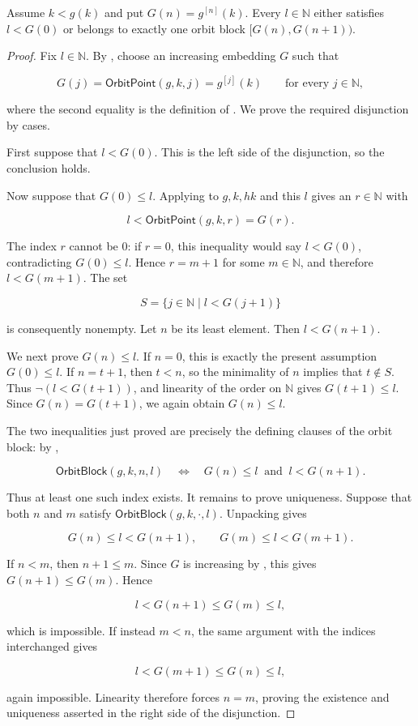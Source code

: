 \begin{lemma}
Assume $k<g(k)$ and put $G(n)=g^{[n]}(k)$.  Every $l\in\mathbb N$ either
satisfies $l<G(0)$ or belongs to exactly one orbit block
$[G(n),G(n+1))$.
\end{lemma}
\begin{proof}
Fix $l\in\mathbb N$.  By , choose an increasing
embedding $G$ such that

\[
G(j)=\mathsf{OrbitPoint}(g,k,j)=g^{[j]}(k)
\qquad\text{for every }j\in\mathbb N,
\]

where the second equality is the definition of .
We prove the required disjunction by cases.

First suppose that $l<G(0)$.  This is the left side of the disjunction,
so the conclusion holds.

Now suppose that $G(0)\leq l$.  Applying  to
$g,k,hk$ and this $l$ gives an $r\in\mathbb N$ with

\[
l<\mathsf{OrbitPoint}(g,k,r)=G(r).
\]

The index $r$ cannot be $0$: if $r=0$, this inequality would say
$l<G(0)$, contradicting $G(0)\leq l$.  Hence $r=m+1$ for some
$m\in\mathbb N$, and therefore $l<G(m+1)$.  The set

\[
S=\{j\in\mathbb N\mid l<G(j+1)\}
\]

is consequently nonempty.  Let $n$ be its least element.  Then
$l<G(n+1)$.

We next prove $G(n)\leq l$.  If $n=0$, this is exactly the present
assumption $G(0)\leq l$.  If $n=t+1$, then $t<n$, so the minimality of
$n$ implies that $t\notin S$.  Thus $\neg(l<G(t+1))$, and linearity of
the order on $\mathbb N$ gives $G(t+1)\leq l$.  Since
$G(n)=G(t+1)$, we again obtain $G(n)\leq l$.

The two inequalities just proved are precisely the defining clauses of
the orbit block: by ,

\[
\mathsf{OrbitBlock}(g,k,n,l)
\quad\Longleftrightarrow\quad
G(n)\leq l\ \text{ and }\ l<G(n+1).
\]

Thus at least one such index exists.  It remains to prove uniqueness.
Suppose that both $n$ and $m$ satisfy
$\mathsf{OrbitBlock}(g,k,\mathord\cdot,l)$.  Unpacking
 gives

\[
G(n)\leq l<G(n+1),
\qquad
G(m)\leq l<G(m+1).
\]

If $n<m$, then $n+1\leq m$.  Since $G$ is increasing by
, this gives $G(n+1)\leq G(m)$.  Hence

\[
l<G(n+1)\leq G(m)\leq l,
\]

which is impossible.  If instead $m<n$, the same argument with the
indices interchanged gives

\[
l<G(m+1)\leq G(n)\leq l,
\]

again impossible.  Linearity therefore forces $n=m$, proving the
existence and uniqueness asserted in the right side of the disjunction.
\end{proof}
